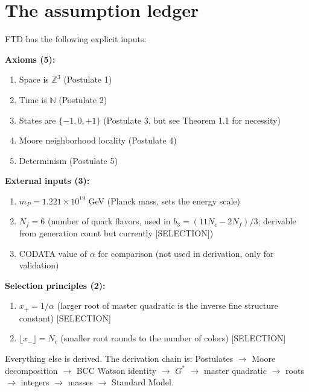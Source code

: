 \documentclass[
  11pt,
  letterpaper,
  twoside,
  openany]{book}
\makeatletter
\providecommand{\tightlist}{%
  \setlength{\itemsep}{0pt}\setlength{\parskip}{0pt}}
\let\orig@section\section
\renewcommand{\section}{\needspace{8\baselineskip}\orig@section}
\newcommand{\Gs}{G^{*}{}}
\makeatother
\begin{document}
\section{The assumption ledger}\label{the-assumption-ledger}

FTD has the following explicit inputs:

\textbf{Axioms (5):}

\begin{enumerate}
\def\labelenumi{\arabic{enumi}.}
\tightlist
\item
  Space is \(\mathbb{Z}^3\) (Postulate 1)
\item
  Time is \(\mathbb{N}\) (Postulate 2)
\item
  States are \(\{-1, 0, +1\}\) (Postulate 3, but see Theorem 1.1 for
  necessity)
\item
  Moore neighborhood locality (Postulate 4)
\item
  Determinism (Postulate 5)
\end{enumerate}

\textbf{External inputs (3):}

\begin{enumerate}
\def\labelenumi{\arabic{enumi}.}
\tightlist
\item
  \(m_P = 1.221 \times 10^{19}\) GeV (Planck mass, sets the energy
  scale)
\item
  \(N_f = 6\) (number of quark flavors, used in
  \(b_3 = (11N_c - 2N_f)/3\); derivable from generation count but
  currently {[}SELECTION{]})
\item
  CODATA value of \(\alpha\) for comparison (not used in derivation,
  only for validation)
\end{enumerate}

\textbf{Selection principles (2):}

\begin{enumerate}
\def\labelenumi{\arabic{enumi}.}
\tightlist
\item
  \(x_+ = 1/\alpha\) (larger root of master quadratic is the inverse
  fine structure constant) {[}SELECTION{]}
\item
  \(\lfloor x_- \rfloor = N_c\) (smaller root rounds to the number of
  colors) {[}SELECTION{]}
\end{enumerate}

Everything else is derived. The derivation chain is: Postulates \(\to\)
Moore decomposition \(\to\) BCC Watson identity \(\to\) \(\Gs\) \(\to\)
master quadratic \(\to\) roots \(\to\) integers \(\to\) masses \(\to\)
Standard Model.
\end{document}
